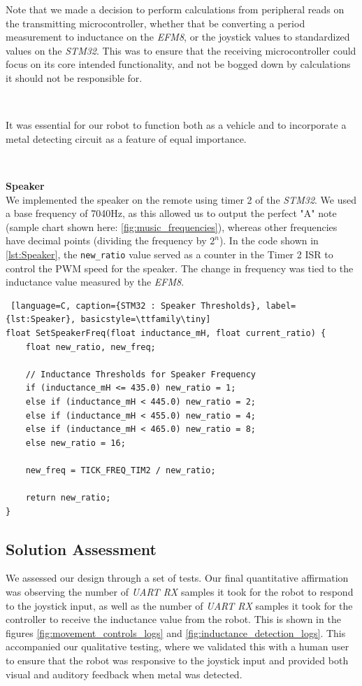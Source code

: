 \documentclass{article}
\begin{document}
Note that we made a decision to perform calculations from peripheral reads on the transmitting microcontroller, whether that be converting a period measurement to inductance on the \textit{EFM8},
or the joystick values to standardized values on the \textit{STM32}. This was to ensure that the receiving microcontroller could focus on its core intended functionality, and not be bogged down by
calculations it should not be responsible for.

\

It was essential for our robot to function both as a vehicle and to incorporate a metal detecting circuit as a feature of equal importance.

\

\textbf{Speaker} \\
We implemented the speaker on the remote using timer 2 of the \textit{STM32}. We used a base frequency of 7040Hz, as this allowed us to output the perfect "A" note (sample chart shown here: \ref{fig:music_frequencies}), whereas other frequencies have decimal points (dividing the frequency by $2^n$).
In the code shown in \ref{lst:Speaker}, the \texttt{new\_ratio} value served as a counter in the Timer 2 ISR to control the PWM speed for the speaker.
The change in frequency was tied to the inductance value measured by the \textit{EFM8}.

\begin{lstlisting} [language=C, caption={STM32 : Speaker Thresholds}, label={lst:Speaker}, basicstyle=\ttfamily\tiny]
float SetSpeakerFreq(float inductance_mH, float current_ratio) {
    float new_ratio, new_freq;

    // Inductance Thresholds for Speaker Frequency
    if (inductance_mH <= 435.0) new_ratio = 1;
    else if (inductance_mH < 445.0) new_ratio = 2;
    else if (inductance_mH < 455.0) new_ratio = 4;
    else if (inductance_mH < 465.0) new_ratio = 8;
    else new_ratio = 16;

    new_freq = TICK_FREQ_TIM2 / new_ratio;

    return new_ratio;
}
\end{lstlisting}

\noindent


\subsection{Solution Assessment}

We assessed our design through a set of tests. Our final quantitative affirmation was observing the number of \textit{UART RX} samples it took for the robot to respond to the joystick input,
as well as the number of \textit{UART RX} samples it took for the controller to receive the inductance value from the robot. This is shown in the
figures \ref{fig:movement_controls_logs} and \ref{fig:inductance_detection_logs}. This accompanied our qualitative testing, where we validated this with a human user to ensure that the robot
was responsive to the joystick input and provided both visual and auditory feedback when metal was detected.
\end{document}
